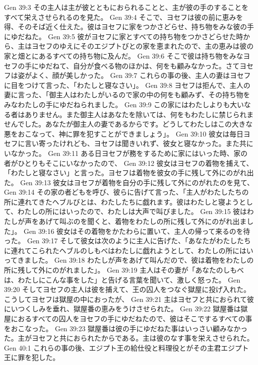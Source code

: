 Gen 39:3  その主人は主が彼とともにおられることと、主が彼の手のすることをすべて栄えさせられるのを見た。
Gen 39:4  そこで、ヨセフは彼の前に恵みを得、そのそば近く仕えた。彼はヨセフに家をつかさどらせ、持ち物をみな彼の手にゆだねた。
Gen 39:5  彼がヨセフに家とすべての持ち物をつかさどらせた時から、主はヨセフのゆえにそのエジプトびとの家を恵まれたので、主の恵みは彼の家と畑とにあるすべての持ち物に及んだ。
Gen 39:6  そこで彼は持ち物をみなヨセフの手にゆだねて、自分が食べる物のほかは、何をも顧みなかった。さてヨセフは姿がよく、顔が美しかった。
Gen 39:7  これらの事の後、主人の妻はヨセフに目をつけて言った、「わたしと寝なさい」。
Gen 39:8  ヨセフは拒んで、主人の妻に言った、「御主人はわたしがいるので家の中の何をも顧みず、その持ち物をみなわたしの手にゆだねられました。
Gen 39:9  この家にはわたしよりも大いなる者はありません。また御主人はあなたを除いては、何をもわたしに禁じられませんでした。あなたが御主人の妻であるからです。どうしてわたしはこの大きな悪をおこなって、神に罪を犯すことができましょう」。
Gen 39:10  彼女は毎日ヨセフに言い寄ったけれども、ヨセフは聞きいれず、彼女と寝なかった。また共にいなかった。
Gen 39:11  ある日ヨセフが務をするために家にはいった時、家の者がひとりもそこにいなかったので、
Gen 39:12  彼女はヨセフの着物を捕えて、「わたしと寝なさい」と言った。ヨセフは着物を彼女の手に残して外にのがれ出た。
Gen 39:13  彼女はヨセフが着物を自分の手に残して外にのがれたのを見て、
Gen 39:14  その家の者どもを呼び、彼らに告げて言った、「主人がわたしたちの所に連れてきたヘブルびとは、わたしたちに戯れます。彼はわたしと寝ようとして、わたしの所にはいったので、わたしは大声で叫びました。
Gen 39:15  彼はわたしが声をあげて叫ぶのを聞くと、着物をわたしの所に残して外にのがれ出ました」。
Gen 39:16  彼女はその着物をかたわらに置いて、主人の帰って来るのを待った。
Gen 39:17  そして彼女は次のように主人に告げた、「あなたがわたしたちに連れてこられたヘブルのしもべはわたしに戯れようとして、わたしの所にはいってきました。
Gen 39:18  わたしが声をあげて叫んだので、彼は着物をわたしの所に残して外にのがれました」。
Gen 39:19  主人はその妻が「あなたのしもべは、わたしにこんな事をした」と告げる言葉を聞いて、激しく怒った。
Gen 39:20  そしてヨセフの主人は彼を捕えて、王の囚人をつなぐ獄屋に投げ入れた。こうしてヨセフは獄屋の中におったが、
Gen 39:21  主はヨセフと共におられて彼にいつくしみを垂れ、獄屋番の恵みをうけさせられた。
Gen 39:22  獄屋番は獄屋におるすべての囚人をヨセフの手にゆだねたので、彼はそこでするすべての事をおこなった。
Gen 39:23  獄屋番は彼の手にゆだねた事はいっさい顧みなかった。主がヨセフと共におられたからである。主は彼のなす事を栄えさせられた。
Gen 40:1  これらの事の後、エジプト王の給仕役と料理役とがその主君エジプト王に罪を犯した。
